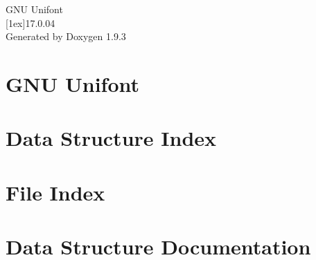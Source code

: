 \documentclass[twoside]{book}
\newcommand{\+}{\discretionary{\mbox{\scriptsize$\hookleftarrow$}}{}{}}
\newcommand{\clearemptydoublepage}{%
    \newpage{\pagestyle{empty}\cleardoublepage}%
  }
\begin{document}
  \raggedbottom
    \hypersetup{pageanchor=false,
                bookmarksnumbered=true,
                pdfencoding=unicode
               }
  \begin{titlepage}
  \vspace*{7cm}
  \begin{center}%
  {\Large GNU Unifont}\\
  [1ex]\large 17.\+0.\+04 \\
  \vspace*{1cm}
  {\large Generated by Doxygen 1.9.3}\\
  \end{center}
  \end{titlepage}
  \clearemptydoublepage
  \tableofcontents
  \clearemptydoublepage
  \hypersetup{pageanchor=true}
\renewcommand{\+}{}
\nonstopmode
\chapter{GNU Unifont}
\label{index}\hypertarget{index}{}
\chapter{Data Structure Index}

\chapter{File Index}

\chapter{Data Structure Documentation}








\end{document}
